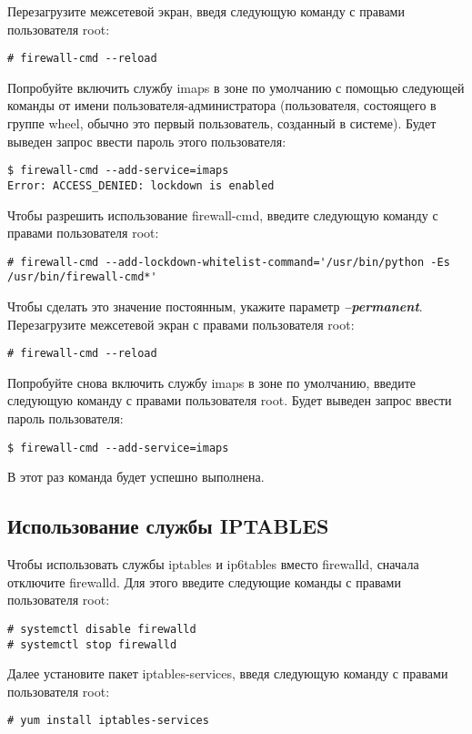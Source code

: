 \documentclass[a4paper,10pt,twoside]{article}
\begin{document}
Перезагрузите межсетевой экран, введя следующую команду с правами пользователя root: 
\begin{verbatim}
# firewall-cmd --reload
\end{verbatim} 

Попробуйте включить службу imaps в зоне по умолчанию с помощью следующей команды от имени пользователя-администратора (пользователя, состоящего в группе wheel, обычно это первый пользователь, созданный в системе). Будет выведен запрос ввести пароль этого пользователя:
\begin{verbatim}
$ firewall-cmd --add-service=imaps
Error: ACCESS_DENIED: lockdown is enabled
\end{verbatim} 

Чтобы разрешить использование firewall-cmd, введите следующую команду с правами пользователя root: 
\begin{verbatim}
# firewall-cmd --add-lockdown-whitelist-command='/usr/bin/python -Es /usr/bin/firewall-cmd*'
\end{verbatim} 
Чтобы сделать это значение постоянным, укажите параметр \textit{\textbf{--permanent}}. 
Перезагрузите межсетевой экран с правами пользователя root: 
\begin{verbatim}
# firewall-cmd --reload
\end{verbatim} 

Попробуйте снова включить службу imaps в зоне по умолчанию, введите следующую команду с правами пользователя root. Будет выведен запрос ввести пароль пользователя:
\begin{verbatim}
$ firewall-cmd --add-service=imaps
\end{verbatim} 
В этот раз команда будет успешно выполнена.


\subsection{Использование службы IPTABLES}

Чтобы использовать службы iptables и ip6tables вместо firewalld, сначала отключите firewalld. Для этого введите следующие команды с правами пользователя root: 
\begin{verbatim}
# systemctl disable firewalld
# systemctl stop firewalld
\end{verbatim} 

Далее установите пакет iptables-services, введя следующую команду с правами пользователя root: 
\begin{verbatim}
# yum install iptables-services
\end{verbatim} 
\end{document}
